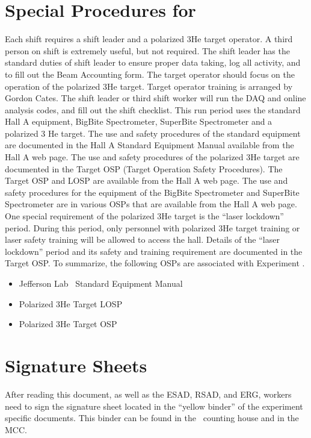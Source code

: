 \section{Special Procedures for \EXPTS}
Each shift requires a shift leader and a polarized 3He target operator. A third person on shift is extremely
useful, but not required. The shift leader has the standard duties of shift leader to ensure proper data taking,
log all activity, and to fill out the Beam Accounting form. The target operator should focus on the operation
of the polarized 3He target. Target operator training is arranged by Gordon Cates. The shift leader or third
shift worker will run the DAQ and online analysis codes, and fill out the shift checklist. This run period
uses the standard Hall A equipment, BigBite Spectrometer, SuperBite Spectrometer and a polarized 3 He
target. The use and safety procedures of the standard equipment are documented in the Hall A Standard
Equipment Manual available from the Hall A web page. The use and safety procedures of the polarized
3He target are documented in the Target OSP (Target Operation Safety Procedures). The Target OSP and
LOSP are available from the Hall A web page. The use and safety procedures for the equipment of the
BigBite Spectrometer and SuperBite Spectrometer are in various OSPs that are available from the Hall A
web page. One special requirement of the polarized 3He target is the “laser lockdown” period. During this
period, only personnel with polarized 3He target training or laser safety training will be allowed to access
the hall. Details of the “laser lockdown” period and its safety and training requirement are documented in
the Target OSP. To summarize, the following OSPs are associated with Experiment \EXPTS.

\begin{itemize}
\item Jefferson Lab \HALL\ Standard Equipment Manual
\item Polarized 3He Target LOSP
\item Polarized 3He Target OSP
\end{itemize}

\newpage
\section{Signature Sheets}

After reading this document, as well as the ESAD, RSAD, and ERG, workers need to sign
the signature sheet located in the ``yellow binder'' of the experiment specific documents.
This binder can be found in the \HALL\ counting house and in the MCC.

